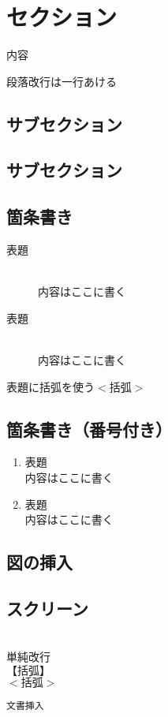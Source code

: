 \documentclass[a4j]{jarticle}
\begin{document}

\section{セクション}
内容

段落改行は一行あける
\subsection{サブセクション}
\subsection{サブセクション}

\subsection{箇条書き}
\begin{description}
\item [表題]~\\
内容はここに書く
\item[表題]\mbox{}\\
内容はここに書く
\item[表題に括弧を使う$<$括弧$>$]
\end{description}

\subsection{箇条書き（番号付き）}
\begin{enumerate}
\item 表題　~\\
内容はここに書く 
\item 表題　\mbox{}\\
内容はここに書く 
\end{enumerate}

\subsection{図の挿入}

\subsection{スクリーン}
\begin{screen}
~\\
単純改行\\
$【括弧】$\\
$<括弧>$ \\
\end{screen}
\begin{verbatim}
文書挿入
\end{verbatim}
\end{document}
